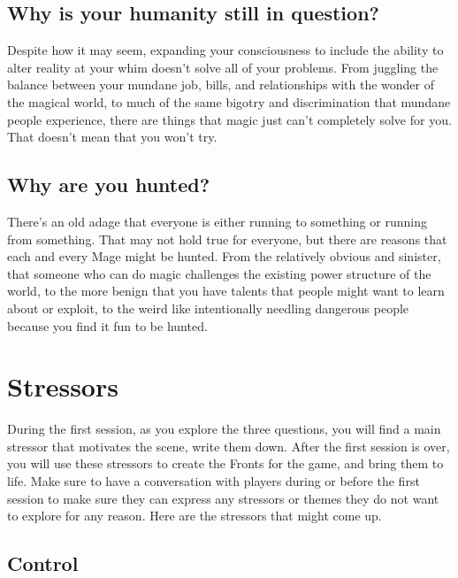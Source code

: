 \documentclass[
  oneside,
  statementpaper,
  9pt]{memoir}
\begin{document}
\hypertarget{why-is-your-humanity-still-in-question}{%
\subsection{Why is your humanity still in
question?}\label{why-is-your-humanity-still-in-question}}

Despite how it may seem, expanding your consciousness to include the
ability to alter reality at your whim doesn't solve all of your
problems. From juggling the balance between your mundane job, bills, and
relationships with the wonder of the magical world, to much of the same
bigotry and discrimination that mundane people experience, there are
things that magic just can't completely solve for you. That doesn't mean
that you won't try.

\hypertarget{why-are-you-hunted}{%
\subsection{Why are you hunted?}\label{why-are-you-hunted}}

There's an old adage that everyone is either running to something or
running from something. That may not hold true for everyone, but there
are reasons that each and every Mage might be hunted. From the
relatively obvious and sinister, that someone who can do magic
challenges the existing power structure of the world, to the more benign
that you have talents that people might want to learn about or exploit,
to the weird like intentionally needling dangerous people because you
find it fun to be hunted.

\hypertarget{stressors}{%
\section{Stressors}\label{stressors}}

During the first session, as you explore the three questions, you will
find a main stressor that motivates the scene, write them down. After
the first session is over, you will use these stressors to create the
Fronts for the game, and bring them to life. Make sure to have a
conversation with players during or before the first session to make
sure they can express any stressors or themes they do not want to
explore for any reason. Here are the stressors that might come up.

\hypertarget{control}{%
\subsection{Control}\label{control}}
\end{document}
